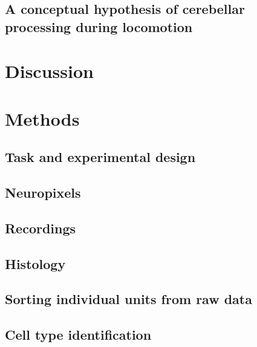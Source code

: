 \subsection{A conceptual hypothesis of cerebellar processing during locomotion}

\section{Discussion}

\section{Methods}
\subsection{Task and experimental design}
\subsection{Neuropixels}
\subsection{Recordings}
\subsection{Histology}
\subsection{Sorting individual units from raw data}
\subsection{Cell type identification}



